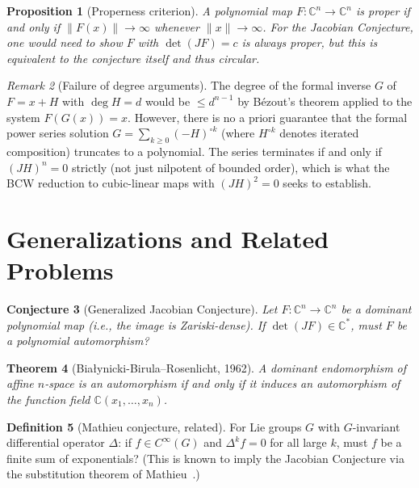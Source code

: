 \documentclass[12pt,a4paper]{amsart}
\newtheorem{theorem}{Theorem}[section]
\newtheorem{proposition}[theorem]{Proposition}
\newtheorem{conjecture}[theorem]{Conjecture}
\theoremstyle{definition}
\newtheorem{definition}[theorem]{Definition}
\theoremstyle{remark}
\newtheorem{remark}[theorem]{Remark}
\begin{document}
\begin{proposition}[Properness criterion]
A polynomial map $F \colon \mathbb{C}^n \to \mathbb{C}^n$ is proper if and only if
$\|F(x)\| \to \infty$ whenever $\|x\| \to \infty$. For the Jacobian Conjecture,
one would need to show $F$ with $\det(JF) = c$ is always proper, but this is
equivalent to the conjecture itself and thus circular.
\end{proposition}

\begin{remark}[Failure of degree arguments]
The degree of the formal inverse $G$ of $F = x + H$ with $\deg H = d$ would be
$\leq d^{n-1}$ by Bézout's theorem applied to the system $F(G(x)) = x$.
However, there is no a priori guarantee that the formal power series solution
$G = \sum_{k \geq 0} (-H)^{\circ k}$ (where $H^{\circ k}$ denotes iterated
composition) truncates to a polynomial. The series terminates if and only if
$(JH)^n = 0$ strictly (not just nilpotent of bounded order), which is what the
BCW reduction to cubic-linear maps with $(JH)^2 = 0$ seeks to establish.
\end{remark}

\section{Generalizations and Related Problems}
\label{sec:gen}

\begin{conjecture}[Generalized Jacobian Conjecture]\label{conj:gen}
Let $F \colon \mathbb{C}^n \to \mathbb{C}^n$ be a dominant polynomial map (i.e.,
the image is Zariski-dense). If $\det(JF) \in \mathbb{C}^*$, must $F$ be a
polynomial automorphism?
\end{conjecture}

\begin{theorem}[Białynicki-Birula--Rosenlicht, 1962]\label{thm:BBR}
A dominant endomorphism of affine $n$-space is an automorphism if and only if
it induces an automorphism of the function field $\mathbb{C}(x_1,\ldots,x_n)$.
\end{theorem}

\begin{definition}[Mathieu conjecture, related]
For Lie groups $G$ with $G$-invariant differential operator $\Delta$: if
$f \in C^\infty(G)$ and $\Delta^k f = 0$ for all large $k$, must $f$ be a
finite sum of exponentials? (This is known to imply the Jacobian Conjecture
via the substitution theorem of Mathieu~\cite{Math97}.)
\end{definition}
\end{document}
